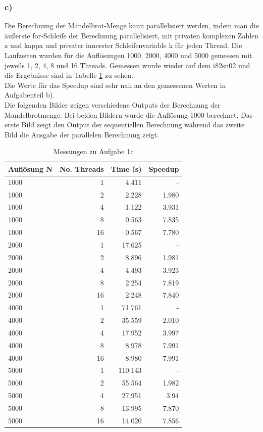 \documentclass{report}
\begin{document}
        \subsubsection{c)}
        Die Berechnung der Mandelbrot-Menge kann parallelisiert werden, indem man die äußerste for-Schleife der Berechnung parallelisiert, mit privaten komplexen Zahlen z und kappa und privater innerster Schleifenvariable k für jeden Thread. Die Laufzeiten wurden für die Auflösungen 1000, 2000, 4000 und 5000 gemessen mit jeweils 1, 2, 4, 8 und 16 Threads. Gemessen wurde wieder auf dem i82sn02 und die Ergebnisse sind in Tabelle \ref{Table:1c} zu sehen..\\ 
		Die Werte für das Speedup sind sehr nah an den gemessenen Werten in Aufgabenteil b).\\
		Die folgenden Bilder zeigen verschiedene Outputs der Berechnung der Mandelbrotmenge. Bei beiden Bildern wurde die Auflösung 1000 berechnet. Das erste Bild zeigt den Output der sequentiellen Berechnung während das zweite Bild die Ausgabe der parallelen Berechnung zeigt.
		
        \begin{table}
        \begin{tabular}{|l|r|r|r|}
        	\hline
        	 Auflösung N & No. Threads &  Time (s) & Speedup \\
        	 	\hline
        	 1000& 1 &  4.411 & - \\
        	 1000& 2 &  2.228 & 1.980 \\
        	 1000& 4 &  1.122 & 3.931 \\
        	 1000& 8 &  0.563 & 7.835\\
        	 1000& 16 &  0.567 & 7.780 \\
        	\hline
        	2000& 1 & 17.625 & - \\
        	2000& 2 &  8.896& 1.981 \\
        	2000& 4 &  4.493& 3.923 \\
        	2000& 8 &  2.254& 7.819 \\
        	2000& 16 &  2.248& 7.840 \\
        	\hline
        	4000& 1 & 71.761 & - \\
        	4000& 2 &  35.559 & 2.010 \\
        	4000& 4 &  17.952& 3.997 \\
        	4000& 8 &  8.978 & 7.991\\
        	4000& 16 &  8.980 & 7.991 \\
        	\hline
        	5000& 1 &  110.143 & - \\
        	5000& 2 &  55.564 & 1.982 \\
        	5000& 4 &  27.951 & 3.94 \\
        	5000& 8 &  13.995 & 7.870 \\
        	5000& 16 &  14.020 & 7.856\\
        	\hline
        \end{tabular}
        \caption{Messungen zu Aufgabe 1c}
         \label{Table:1c}
        \end{table}
    
\end{document}
